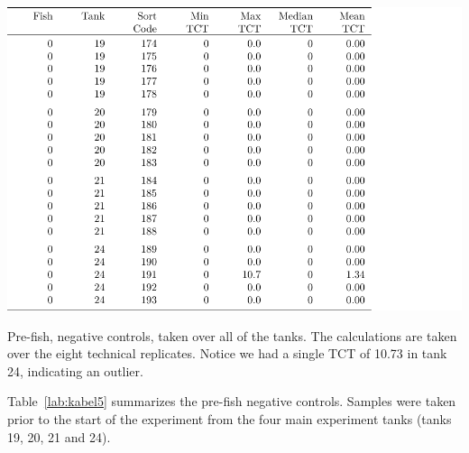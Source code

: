 \begin{table}[H]
\includegraphics{Chapter3Images/kable5fixed2.pdf}
\caption{ \hspace{1mm}Pre-fish, negative controls, taken over all of the tanks. The calculations are taken over the eight technical replicates. Notice we had a single TCT of 10.73 in tank 24, indicating an outlier. }
\label{lab:kabel5}
\end{table}



Table~\ref{lab:kabel5} summarizes the pre-fish negative controls. Samples were taken prior to the start of the experiment from the four main experiment tanks (tanks 19, 20, 21 and 24).